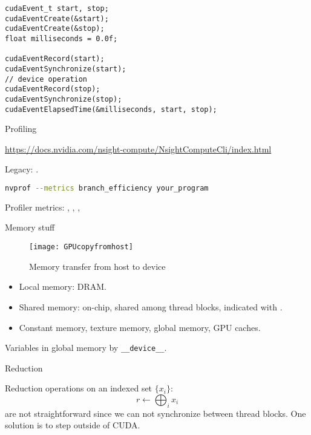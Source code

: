\begin{lstlisting}
cudaEvent_t start, stop;
cudaEventCreate(&start);
cudaEventCreate(&stop);
float milliseconds = 0.0f;
 
cudaEventRecord(start);
cudaEventSynchronize(start);
// device operation
cudaEventRecord(stop);
cudaEventSynchronize(stop);
cudaEventElapsedTime(&milliseconds, start, stop);
\end{lstlisting}

 {Profiling}

\url{https://docs.nvidia.com/nsight-compute/NsightComputeCli/index.html}

\begin{remark}
  Legacy: .
\begin{lstlisting}[language=bash]
nvprof --metrics branch_efficiency your_program
\end{lstlisting}
\end{remark}

Profiler metrics:
,
,
,

 {Memory stuff}

\begin{figure}[ht]
  \texttt{[image: GPUcopyfromhost]}
  \caption{Memory transfer from host to device}
\end{figure}


\begin{itemize}
\item Local memory: DRAM.
\item Shared memory: on-chip, shared among thread blocks,
  indicated with .
\item Constant memory, texture memory, global memory, GPU caches.
\end{itemize}

Variables in global memory by \lstinline{__device__}.

 {Reduction}
\label{sec:cu-reduce}

Reduction operations on an indexed set $\{x_i\}$:
\[ r\leftarrow \bigoplus_i x_i \]
are not straightforward since we can not
synchronize between thread blocks.
One solution is to step outside of CUDA.

